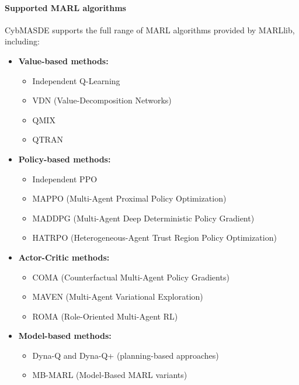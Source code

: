 \documentclass[pdflatex,sn-mathphys-num]{sn-jnl}%
\theoremstyle{thmstyleone}%
\theoremstyle{thmstyletwo}%
\theoremstyle{thmstylethree}%
\begin{document}
\paragraph{Supported MARL algorithms} 
CybMASDE supports the full range of MARL algorithms provided by MARLlib, including:
\begin{itemize}
    \item \textbf{Value-based methods:} 
    \begin{itemize}
        \item Independent Q-Learning
        \item VDN (Value-Decomposition Networks)~\cite{sunehag2018vdn}
        \item QMIX~\cite{rashid2018qmix}
        \item QTRAN~\cite{son2019qtran}
    \end{itemize}
    \item \textbf{Policy-based methods:}
    \begin{itemize}
        \item Independent PPO
        \item MAPPO (Multi-Agent Proximal Policy Optimization)~\cite{yu2021mappo}
        \item MADDPG (Multi-Agent Deep Deterministic Policy Gradient)~\cite{lowe2017multi}
        \item HATRPO (Heterogeneous-Agent Trust Region Policy Optimization)~\cite{kuba2021trust}
    \end{itemize}
    \item \textbf{Actor-Critic methods:}
    \begin{itemize}
        \item COMA (Counterfactual Multi-Agent Policy Gradients)~\cite{foerster2018counterfactual}
        \item MAVEN (Multi-Agent Variational Exploration)~\cite{mahajan2019maven}
        \item ROMA (Role-Oriented Multi-Agent RL)~\cite{wang2020roma}
    \end{itemize}
    \item \textbf{Model-based methods:}
    \begin{itemize}
        \item Dyna-Q and Dyna-Q+ (planning-based approaches)
        \item MB-MARL (Model-Based MARL variants)
    \end{itemize}
\end{itemize}
\end{document}
